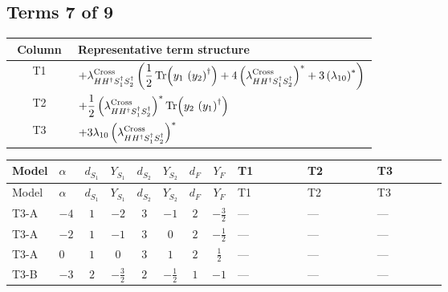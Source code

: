 \documentclass[8pt]{article}
\begin{document}
\begin{landscape}
\subsection*{Terms 7 of 9}
\begin{center}
\begin{tabular}{@{}c >{\raggedright\arraybackslash}p{0.82\linewidth}@{}}
\toprule
Column & Representative term structure \\
\midrule
T1 & \(\displaystyle +{\lambda_{H H^\dagger S_1^\dagger S_2^\dagger}^{\rm Cross}} \left(\frac{1}{2} \operatorname{Tr}\!\left({y_1}\,\left({y_2}\right)^{\dagger}\right)+4 \left({\lambda_{H H^\dagger S_1^\dagger S_2^\dagger}^{\rm Cross}}\right)^{*}+3 \left({\lambda_{10}}\right)^{*}\right)\) \\
\midrule
T2 & \(\displaystyle +\frac{1}{2} \left({\lambda_{H H^\dagger S_1^\dagger S_2^\dagger}^{\rm Cross}}\right)^{*} \operatorname{Tr}\!\left({y_2}\,\left({y_1}\right)^{\dagger}\right)\) \\
\midrule
T3 & \(\displaystyle +3 {\lambda_{10}} \left({\lambda_{H H^\dagger S_1^\dagger S_2^\dagger}^{\rm Cross}}\right)^{*}\) \\
\midrule
\bottomrule
\end{tabular}
\end{center}
\smallskip
\tiny
\begin{longtable}{@{}llcccccc >{\raggedright\arraybackslash}p{0.21\linewidth} >{\raggedright\arraybackslash}p{0.21\linewidth} >{\raggedright\arraybackslash}p{0.21\linewidth}@{}}
\toprule
Model & $\alpha$ & $d_{S_1}$ & $Y_{S_1}$ & $d_{S_2}$ & $Y_{S_2}$ & $d_F$ & $Y_F$ & T1 & T2 & T3 \\
\midrule
\endfirsthead
\toprule
Model & $\alpha$ & $d_{S_1}$ & $Y_{S_1}$ & $d_{S_2}$ & $Y_{S_2}$ & $d_F$ & $Y_F$ & T1 & T2 & T3 \\
\midrule
\endhead
T3-A & $-4$ & $1$ & $-2$ & $3$ & $-1$ & $2$ & $-\frac{3}{2}$ & --- & --- & --- \\
\midrule
T3-A & $-2$ & $1$ & $-1$ & $3$ & $0$ & $2$ & $-\frac{1}{2}$ & --- & --- & --- \\
\midrule
T3-A & $0$ & $1$ & $0$ & $3$ & $1$ & $2$ & $\frac{1}{2}$ & --- & --- & --- \\
\midrule
T3-B & $-3$ & $2$ & $-\frac{3}{2}$ & $2$ & $-\frac{1}{2}$ & $1$ & $-1$ & --- & --- & --- \\
\midrule

\end{longtable}
\end{landscape}
\end{document}
